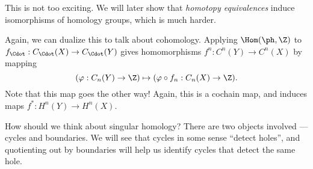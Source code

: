 \documentclass[a4paper]{article}
\theoremstyle{definition}
\begin{document}
This is not too exciting. We will later show that \emph{homotopy equivalences} induce isomorphisms of homology groups, which is much harder.

Again, we can dualize this to talk about cohomology. Applying $\Hom(\ph, \Z)$ to $f_{\Cdot}: C_{\Cdot}(X) \to C_{\Cdot}(Y)$ gives homomorphisms $f^n: C^n(Y) \to C^n(X)$ by mapping
\[
  (\varphi: C_n(Y) \to \Z) \mapsto (\varphi \circ f_n: C_n(X) \to \Z).
\]
Note that this map goes the other way! Again, this is a cochain map, and induces maps $f^*: H^n(Y) \to H^n(X)$.

How should we think about singular homology? There are two objects involved --- cycles and boundaries. We will see that cycles in some sense ``detect holes'', and quotienting out by boundaries will help us identify cycles that detect the same hole.
\end{document}
